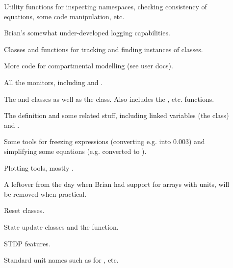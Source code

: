 \documentclass[letterpaper,10pt,english]{manual}
\begin{document}
\begin{description}
\item[] \leavevmode
Utility functions for inspecting namespaces, checking consistency of
equations, some code manipulation, etc.

\item[] \leavevmode
Brian's somewhat under-developed logging capabilities.

\item[] \leavevmode
Classes and functions for tracking and finding instances of classes.

\item[] \leavevmode
More code for compartmental modelling (see user docs).

\item[] \leavevmode
All the monitors, including  and .

\item[] \leavevmode
The  and  classes as well as the
 class. Also includes the , etc.
functions.

\item[] \leavevmode
The  definition and some related stuff, including linked
variables (the  class) and .

\item[] \leavevmode
Some tools for freezing expressions (converting e.g.  into 0.003) and
simplifying some equations (e.g.  converted to ).

\item[] \leavevmode
Plotting tools, mostly .

\item[] \leavevmode
A leftover from the day when Brian had support for arrays with units, will
be removed when practical.

\item[] \leavevmode
Reset classes.

\item[] \leavevmode
State update classes and the  function.

\item[] \leavevmode
STDP features.

\item[] \leavevmode
Standard unit names such as  for , etc.


\end{description}
\end{document}
